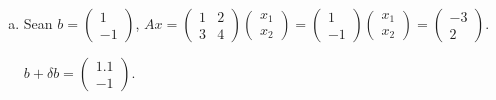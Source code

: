 \begin{frame}
\begin{solution}
\begin{enumerate}[a)]
			      \begin{math}
				      {\left\|A^{-1}\right\|}_{\infty}=
				      \max\left\{\left(\left|-2\right|+\left|1\right|,\left|1.5\right|+\left|-0.5\right|\right)\right\}=
				      3
			      \end{math}.
			      Por lo tanto,
			      \begin{math}
				      \operatorname{Cond}\left(A\right)=
				      7\times3=
				      21.
			      \end{math}

			\item

			      Sean
			      \begin{math}
				      b
				      =
				      \begin{pmatrix}
					      1 \\
					      -1
				      \end{pmatrix}
			      \end{math},
			      \begin{math}
				      Ax=
				      \begin{pmatrix}
					      1 & 2 \\
					      3 & 4
				      \end{pmatrix}
				      \begin{pmatrix}
					      x_{1} \\
					      x_{2}
				      \end{pmatrix}
				      =
				      \begin{pmatrix}
					      1 \\
					      -1
				      \end{pmatrix}
				      \begin{pmatrix}
					      x_{1} \\
					      x_{2}
				      \end{pmatrix}
				      =
				      \begin{pmatrix}
					      -3 \\
					      2
				      \end{pmatrix}
			      \end{math}.

			      \begin{math}
				      b+\delta b =
				      \begin{pmatrix}
					      1.1 \\
					      -1
				      \end{pmatrix}
			      \end{math}.


\end{enumerate}
\end{solution}
\end{frame}
